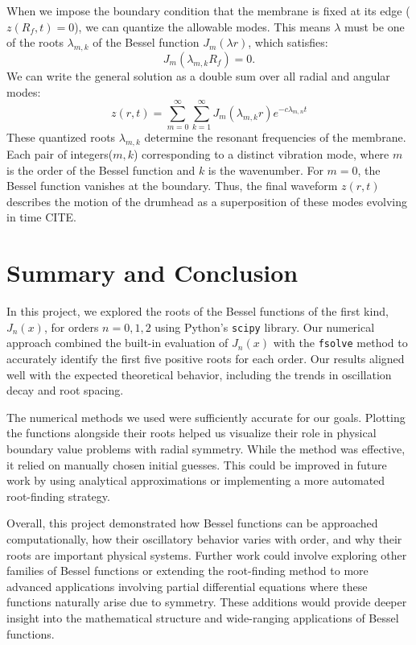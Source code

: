 \documentclass[linenumbers, twocolumn]{aastex631}
\begin{document}
\noindent When we impose the boundary condition that the membrane is fixed at
its edge ($z(R_f,t)=0$), we can quantize the allowable modes. This means $\lambda$
must be one of the roots $\lambda_{m,k}$ of the Bessel 
function $J_m(\lambda r)$, which satisfies:
\begin{equation}
    J_m(\lambda_{m,k}R_f)=0.
\end{equation}
\noindent We can write the general solution as a double sum over all radial and
angular modes:
\begin{equation}
    z(r,t)=\sum_{m=0}^\infty \sum_{k=1}^\infty J_m(\lambda_{m,k}r)e^{-c\lambda_{m,n}t}
\end{equation}
\noindent These quantized roots $\lambda_{m,k}$ determine the resonant frequencies
of the membrane. Each pair of integers($m,k$) corresponding to a distinct
vibration mode, where $m$ is the order of the Bessel function and $k$ is the wavenumber.
For $m=0$, the Bessel function vanishes at the boundary. Thus, the final waveform
$z(r,t)$ describes the motion of the drumhead as a superposition of these modes evolving in time CITE.\\


\section{Summary and Conclusion} \label{sec:summary}

In this project, we explored the roots of the Bessel functions of the first kind, 
$J_n(x)$, for orders $n=0,1,2$ using Python's \texttt{scipy} library. Our numerical
approach combined the built-in evaluation of $J_n(x)$ with the \texttt{fsolve}
method to accurately identify the first five positive roots for each order. Our
results aligned well with the expected theoretical behavior, including the trends
in oscillation decay and root spacing.

\noindent The numerical methods we used were sufficiently accurate for our goals.
Plotting the functions alongside their roots helped us visualize their role in
physical boundary value problems with radial symmetry. While the method was
effective, it relied on manually chosen initial guesses. This could be improved in
future work by using analytical approximations or implementing a more automated
root-finding strategy.

\noindent Overall, this project demonstrated how Bessel functions can be approached
computationally, how their oscillatory behavior varies with order, and why their
roots are important physical systems. Further work could involve exploring other 
families of Bessel functions or extending the root-finding method to more
advanced applications involving partial differential equations where these functions
naturally arise due to symmetry. These additions would provide deeper insight into the
mathematical structure and wide-ranging applications of Bessel functions.\\
\end{document}
